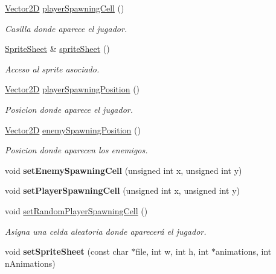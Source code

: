 \begin{DoxyCompactItemize}
\item 
\hyperlink{class_vector2_d}{Vector2\-D} \hyperlink{class_scenario_a867a2986faf6ab2b027d783edc0d9a00}{player\-Spawning\-Cell} ()
\begin{DoxyCompactList}\small\item\em Casilla donde aparece el jugador. \end{DoxyCompactList}\item 
\hyperlink{class_sprite_sheet}{Sprite\-Sheet} \& \hyperlink{class_scenario_a823adba186e44615fcb34990713d9d4c}{sprite\-Sheet} ()
\begin{DoxyCompactList}\small\item\em Acceso al sprite asociado. \end{DoxyCompactList}\item 
\hyperlink{class_vector2_d}{Vector2\-D} \hyperlink{class_scenario_a95e4e91a8989095a0aff9eccdc4b2180}{player\-Spawning\-Position} ()
\begin{DoxyCompactList}\small\item\em Posicion donde aparece el jugador. \end{DoxyCompactList}\item 
\hyperlink{class_vector2_d}{Vector2\-D} \hyperlink{class_scenario_a2415ebf67ac30ed8a32f074a07b16904}{enemy\-Spawning\-Position} ()
\begin{DoxyCompactList}\small\item\em Posicion donde aparecen los enemigos. \end{DoxyCompactList}\item 
\hypertarget{class_scenario_a6b4df480c24ac6e608b0db70213d1756}{void {\bfseries set\-Enemy\-Spawning\-Cell} (unsigned int x, unsigned int y)}\label{class_scenario_a6b4df480c24ac6e608b0db70213d1756}

\item 
\hypertarget{class_scenario_a696289efceb56b7e53b9ebd657b69c3e}{void {\bfseries set\-Player\-Spawning\-Cell} (unsigned int x, unsigned int y)}\label{class_scenario_a696289efceb56b7e53b9ebd657b69c3e}

\item 
\hypertarget{class_scenario_a75e4afed8ae12a12fbf822d2a23aebf4}{void \hyperlink{class_scenario_a75e4afed8ae12a12fbf822d2a23aebf4}{set\-Random\-Player\-Spawning\-Cell} ()}\label{class_scenario_a75e4afed8ae12a12fbf822d2a23aebf4}

\begin{DoxyCompactList}\small\item\em Asigna una celda aleatoria donde aparecerá el jugador. \end{DoxyCompactList}\item 
\hypertarget{class_scenario_a3d9f5b2d8f7fe2ff636c4d9d7b96caa7}{void {\bfseries set\-Sprite\-Sheet} (const char $\ast$file, int w, int h, int $\ast$animations, int n\-Animations)}\label{class_scenario_a3d9f5b2d8f7fe2ff636c4d9d7b96caa7}


\end{DoxyCompactItemize}

